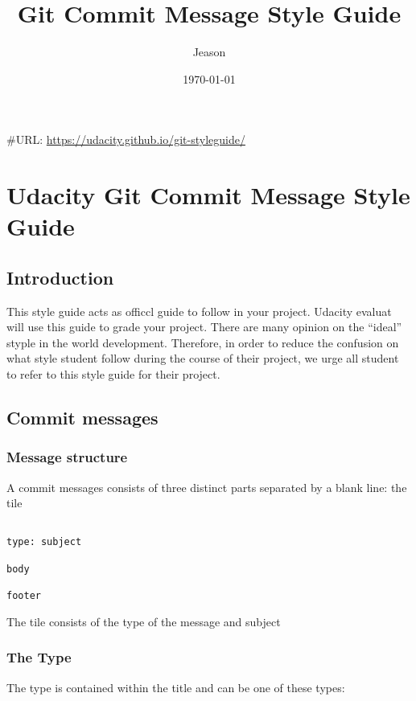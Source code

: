 \documentclass[11pt]{article}
\author{Jeason}
\date{\today}
\title{Git Commit Message Style Guide}
\begin{document}
\maketitle
\tableofcontents

\#URL: \url{https://udacity.github.io/git-styleguide/}

\section{Udacity Git Commit Message Style Guide}
\label{sec:orgd75e8e3}
\subsection{Introduction}
\label{sec:org1a80c85}

This style guide acts as officcl guide to follow in your project. Udacity evaluat will use this guide to grade your project. There are many opinion on the ``ideal'' styple in the world development. Therefore, in order to reduce the confusion on what style student follow during the course of their project, we urge all student to refer to this style guide for their project.

\subsection{Commit messages}
\label{sec:orgf6b7366}

\subsubsection{Message structure}
\label{sec:orgbef3b73}

A commit messages consists of three distinct parts separated by a blank line: the tile

\begin{verbatim}

type: subject

body

footer

\end{verbatim}

The tile consists of the type of the message and subject

\subsubsection{The Type}
\label{sec:org2d6897f}
The  type is contained within the title and can be one of these types:
\end{document}
